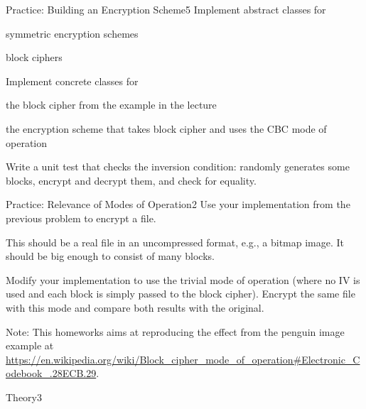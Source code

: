 \documentclass[a4paper]{article}
\begin{document}
\header

\begin{problem}{Practice: Building an Encryption Scheme}{5}
Implement abstract classes for
\begin{compactitem}
 \item symmetric encryption schemes
 \item block ciphers
\end{compactitem}

Implement concrete classes for
\begin{compactitem}
 \item the block cipher from the example in the lecture
 \item the encryption scheme that takes block cipher and uses the CBC mode of operation
\end{compactitem} 

Write a unit test that checks the inversion condition: randomly generates some blocks, encrypt and decrypt them, and check for equality.
\end{problem}

\begin{problem}{Practice: Relevance of Modes of Operation}{2}
Use your implementation from the previous problem to encrypt a file.

This should be a real file in an uncompressed format, e.g., a bitmap image.
It should be big enough to consist of many blocks.

Modify your implementation to use the trivial mode of operation (where no IV is used and each block is simply passed to the block cipher).
Encrypt the same file with this mode and compare both results with the original.

Note: This homeworks aims at reproducing the effect from the penguin image example at \url{https://en.wikipedia.org/wiki/Block_cipher_mode_of_operation#Electronic_Codebook_.28ECB.29}.
\end{problem}

\begin{problem}{Theory}{3}

\end{problem}
\end{document}
